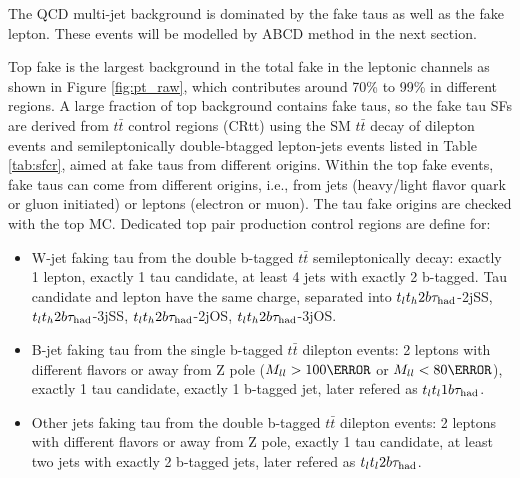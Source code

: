 The QCD multi-jet background is dominated by the fake taus as well as the fake lepton. These events will be modelled by ABCD method in the next section.

Top fake is the largest background in the total fake in the leptonic channels as shown in Figure \ref{fig:pt_raw}, which contributes around 70\% to 99\% in different regions. A large fraction of top background contains fake taus, so the fake tau SFs are derived from $t\bar{t}$ control regions (CRtt) using the SM $t\bar t$ decay of dilepton events and semileptonically double-btagged lepton-jets events listed in Table \ref{tab:sfcr}, aimed at fake taus from different origins.
Within the top fake events, fake taus can come from different origins, i.e., from jets (heavy/light flavor quark or gluon initiated) or leptons (electron or muon). The tau fake origins are checked with the top MC. Dedicated top pair production control regions are define for:
\begin{itemize}
\item{W-jet faking tau from the double b-tagged $t\bar t$ semileptonically decay: exactly 1 lepton, exactly 1 tau candidate, at least 4 jets with exactly 2 b-tagged. Tau candidate and lepton have the same charge, separated into
  $t_lt_h2b\tau_\text{had}$-2jSS, $t_lt_h2b\tau_\text{had}$-3jSS, $t_lt_h2b\tau_\text{had}$-2jOS, $t_lt_h2b\tau_\text{had}$-3jOS.}
\item{B-jet faking tau from the single b-tagged $t\bar t$ dilepton events: 2 leptons with different flavors or away from Z pole ($M_{ll}>100\GeV$ or $M_{ll}<80\GeV$), exactly 1 tau candidate, exactly 1 b-tagged jet, later refered as
  $t_lt_l1b\tau_\text{had}$.}
\item{Other jets faking tau from the double b-tagged $t\bar t$ dilepton events: 2 leptons with different flavors or away from Z pole, exactly 1 tau candidate, at least two jets with exactly 2 b-tagged jets, later refered as $t_lt_l2b\tau_\text{had}$.}
\end{itemize}



